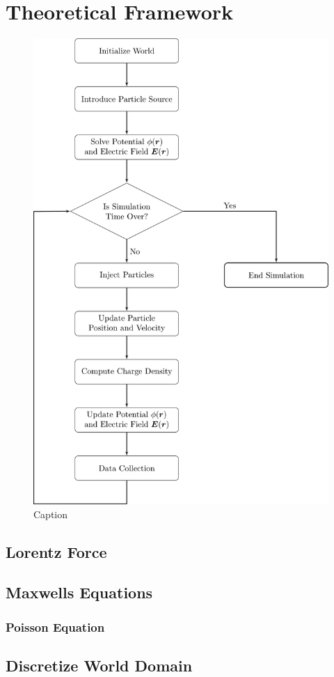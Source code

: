 \chapter{Theoretical Framework}

\begin{figure}[h]
    \centering
    \includegraphics[width=0.7\linewidth]{figures/chapter 2/Flowchart_Studienprojekt-1.png}
    \caption{Caption}
    \label{fig:enter-label}
\end{figure}

\section{Lorentz Force}

\section{Maxwells Equations}

\subsection{Poisson Equation}

\section{Discretize World Domain}

